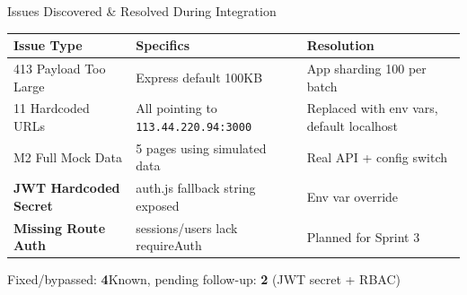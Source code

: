 \documentclass[aspectratio=169,utf8,11pt]{beamer}
\newcommand{\bug}[1]{\textcolor{bugred}{\textbf{#1}}}
\begin{document}
\begin{frame}{Issues Discovered \& Resolved During Integration}
  \begin{table}[h]
    \centering
    \renewcommand{\arraystretch}{1.2}
    \small
    \begin{tabular}{p{2.6cm}p{5.0cm}p{4.0cm}}
      \toprule
      \textbf{Issue Type} & \textbf{Specifics} & \textbf{Resolution} \\
      \midrule
      413 Payload Too Large & Express default 100KB & App sharding 100 per batch \\
      11 Hardcoded URLs & All pointing to \texttt{113.44.220.94:3000} & Replaced with env vars, default localhost \\
      M2 Full Mock Data & 5 pages using simulated data & Real API + config switch \\
      \bug{JWT Hardcoded Secret} & auth.js fallback string exposed & Env var override \\
      \bug{Missing Route Auth} & sessions/users lack requireAuth & Planned for Sprint 3 \\
      \bottomrule
    \end{tabular}
  \end{table}
  \vspace{-0.15cm}
  \begin{center}\footnotesize Fixed/bypassed: \textbf{4}\qquad Known, pending follow-up: \textbf{2} (JWT secret + RBAC)\end{center}
\end{frame}
\end{document}
